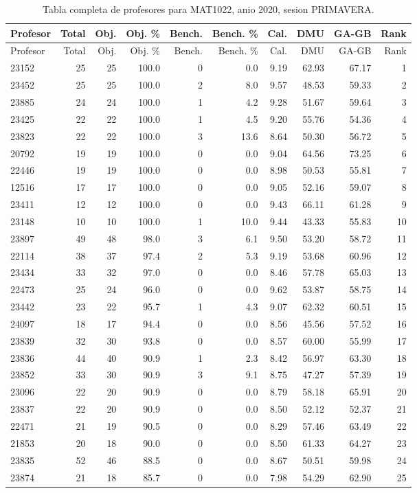 \begingroup
\scriptsize
\setlength{\tabcolsep}{3pt}
\begin{longtable}{lrrrrrrrrr}
\caption{Tabla completa de profesores para MAT1022, anio 2020, sesion PRIMAVERA.}\label{tab:prof-period-mat1022-2020-primavera}\\
\toprule
Profesor & Total & Obj. & Obj. \% & Bench. & Bench. \% & Cal. & DMU & GA-GB & Rank \\
\midrule
\endfirsthead
\toprule
Profesor & Total & Obj. & Obj. \% & Bench. & Bench. \% & Cal. & DMU & GA-GB & Rank \\
\midrule
\endhead
23152 & 25 & 25 & 100.0 & 0 & 0.0 & 9.19 & 62.93 & 67.17 & 1 \\
23452 & 25 & 25 & 100.0 & 2 & 8.0 & 9.57 & 48.53 & 59.33 & 2 \\
23885 & 24 & 24 & 100.0 & 1 & 4.2 & 9.28 & 51.67 & 59.64 & 3 \\
23425 & 22 & 22 & 100.0 & 1 & 4.5 & 9.20 & 55.76 & 54.36 & 4 \\
23823 & 22 & 22 & 100.0 & 3 & 13.6 & 8.64 & 50.30 & 56.72 & 5 \\
20792 & 19 & 19 & 100.0 & 0 & 0.0 & 9.04 & 64.56 & 73.25 & 6 \\
22446 & 19 & 19 & 100.0 & 0 & 0.0 & 8.98 & 50.53 & 55.81 & 7 \\
12516 & 17 & 17 & 100.0 & 0 & 0.0 & 9.05 & 52.16 & 59.07 & 8 \\
23411 & 12 & 12 & 100.0 & 0 & 0.0 & 9.43 & 66.11 & 61.28 & 9 \\
23148 & 10 & 10 & 100.0 & 1 & 10.0 & 9.44 & 43.33 & 55.83 & 10 \\
23897 & 49 & 48 & 98.0 & 3 & 6.1 & 9.50 & 53.20 & 58.72 & 11 \\
22114 & 38 & 37 & 97.4 & 2 & 5.3 & 9.19 & 53.68 & 60.96 & 12 \\
23434 & 33 & 32 & 97.0 & 0 & 0.0 & 8.46 & 57.78 & 65.03 & 13 \\
22473 & 25 & 24 & 96.0 & 0 & 0.0 & 9.62 & 53.87 & 58.75 & 14 \\
23442 & 23 & 22 & 95.7 & 1 & 4.3 & 9.07 & 62.32 & 60.51 & 15 \\
24097 & 18 & 17 & 94.4 & 0 & 0.0 & 8.56 & 45.56 & 57.52 & 16 \\
23839 & 32 & 30 & 93.8 & 0 & 0.0 & 8.57 & 60.00 & 55.99 & 17 \\
23836 & 44 & 40 & 90.9 & 1 & 2.3 & 8.42 & 56.97 & 63.30 & 18 \\
23852 & 33 & 30 & 90.9 & 3 & 9.1 & 8.75 & 47.27 & 57.39 & 19 \\
23096 & 22 & 20 & 90.9 & 0 & 0.0 & 8.79 & 58.18 & 65.91 & 20 \\
23837 & 22 & 20 & 90.9 & 0 & 0.0 & 8.50 & 52.12 & 52.37 & 21 \\
22471 & 21 & 19 & 90.5 & 0 & 0.0 & 8.29 & 57.46 & 63.49 & 22 \\
21853 & 20 & 18 & 90.0 & 0 & 0.0 & 8.50 & 61.33 & 64.27 & 23 \\
23835 & 52 & 46 & 88.5 & 0 & 0.0 & 8.67 & 50.51 & 59.98 & 24 \\
23874 & 21 & 18 & 85.7 & 0 & 0.0 & 7.98 & 54.29 & 62.90 & 25 \\
\bottomrule
\end{longtable}
\endgroup


